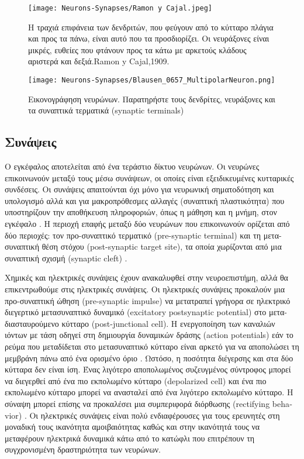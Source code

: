 \documentclass[12pt]{report}
\begin{document}
\begin{figure}[htp]
    \centering
    \texttt{[image: Neurons-Synapses/Ramon y Cajal.jpeg]}
    \caption{Η τραχιά επιφάνεια των δενδριτών, που φεύγουν από το κύτταρο πλάγια και προς τα πάνω, είναι αυτό που τα προσδιορίζει. Οι νευράξονες είναι μικρές, ευθείες που φτάνουν προς τα κάτω με αρκετούς κλάδους αριστερά και δεξιά.\textlatin{Ramon y Cajal},1909.}
    \label{fig:neurons-ramoncajal}
\end{figure}

\begin{figure}[htp]
    \centering
    \texttt{[image: Neurons-Synapses/Blausen\_0657\_MultipolarNeuron.png]}
    \caption{Εικονογράφηση νευρώνων. Παρατηρήστε τους δενδρίτες,  νευράξονες και τα συναπτικά τερματικά (\textlatin{synaptic terminals}) }
    \label{fig:neurons-multipolar}
\end{figure}
\subsection{Συνάψεις}
Ο εγκέφαλος αποτελείται από ένα τεράστιο δίκτυο νευρώνων. Οι νευρώνες επικοινωνούν μεταξύ τους μέσω συνάψεων, οι οποίες είναι εξειδικευμένες κυτταρικές συνδέσεις. Οι συνάψεις απαιτούνται όχι μόνο για νευρωνική σηματοδότηση και υπολογισμό αλλά και για μακροπρόθεσμες αλλαγές (συναπτική πλαστικότητα) που υποστηρίζουν την αποθήκευση πληροφοριών, όπως η μάθηση και η μνήμη, στον εγκέφαλο \cite{li2003}. Η περιοχή επαφής μεταξύ δύο νευρώνων που επικοινωνούν ορίζεται από δύο περιοχές: τον προ-συναπτικό τερματικό (\textlatin{pre-synaptic terminal}) και τη μετα-συναπτική θέση στόχου (\textlatin{post-synaptic target site}), τα οποία χωρίζονται από μια συναπτική σχισμή (\textlatin{synaptic cleft}) .

Χημικές και ηλεκτρικές συνάψεις έχουν ανακαλυφθεί στην νευροεπιστήμη, αλλά θα επικεντρωθούμε στις ηλεκτρικές συνάψεις. Οι ηλεκτρικές συνάψεις προκαλούν μια προ-συναπτική ώθηση (\textlatin{pre-synaptic impulse}) να μετατραπεί γρήγορα σε ηλεκτρικό διεγερτικό μετασυναπτικό δυναμικό (\textlatin{excitatory postsynaptic potential}) στο μετα-διασταυρούμενο κύτταρο (\textlatin{post-junctional cell}). Η ενεργοποίηση των καναλιών ιόντων με τάση οδηγεί στη δημιουργία δυναμικών δράσης (\textlatin{action potentials})  εάν το ρεύμα που μεταδίδεται στο μετασυναπτικό κύτταρο είναι αρκετό για να αποπολώσει τη μεμβράνη πάνω από ένα ορισμένο όριο \cite{Hormuzdi2004}. Ωστόσο, η ποσότητα διέγερσης και στα δύο κύτταρα δεν είναι ίση. Ένας λιγότερο αποπολωμένος συζευγμένος σύντροφος μπορεί να διεγερθεί από ένα πιο εκπολωμένο κύτταρο (\textlatin{depolarized cell}) και ένα πιο εκπολωμένο κύτταρο μπορεί να ανασταλεί από ένα λιγότερο εκπολωμένο κύτταρο. Η σύναψη μπορεί επίσης να προκαλέσει μια συμπεριφορά διόρθωσης (\textlatin{rectifying behavior}) \cite{Furshpan1959}. Οι ηλεκτρικές συνάψεις είναι πολύ ενδιαφέρουσες για τους ερευνητές στη μοναδική τους ικανότητα αμοιβαιότητας καθώς και στην ικανότητά τους να μεταφέρουν ηλεκτρικά δυναμικά κάτω από το κατώφλι που επιτρέπουν τη συγχρονισμένη δραστηριότητα των νευρώνων.
\end{document}
